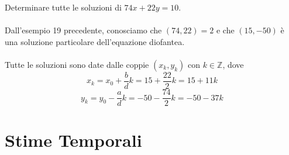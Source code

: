 \documentclass[a4paper,12pt, oneside]{book}
\begin{document}
\begin{shaded}
	\begin{esempio}
		Determinare tutte le soluzioni di $74x+22y=10$.\\\\
		Dall'esempio 19 precedente, conosciamo che $(74,22) = 2$ e che $(15,-50)$ è una soluzione particolare dell'equazione diofantea.\\\\
		Tutte le soluzioni sono date dalle coppie $(x_k,y_k)$ con $k \in \mathbb{Z}$, dove
		$$x_k = x_0 + \frac{b}{d}k = 15+\frac{22}{2}k = 15 + 11k$$
		$$y_k = y_0 - \frac{a}{d}k = -50-\frac{74}{2}k = -50-37k$$
	\end{esempio}
\end{shaded}

\chapter{Stime Temporali}
\end{document}
